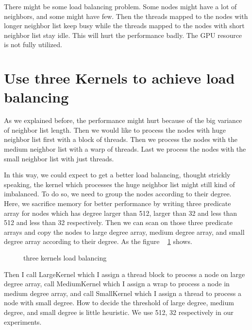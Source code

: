 \documentclass[12pt] {article}
\begin{document}
There might be some load balancing problem. Some nodes might have a lot of neighbors, and some might have few. Then the threads mapped to the nodes with longer neighbor
list keep busy while the threads mapped to the nodes with short neighbor list stay idle. This will hurt the performance badly. The GPU resource is not fully
utilized.

\section*{Use three Kernels to achieve load balancing}
As we explained before, the performance might hurt because of the big variance of neighbor list length. Then we would like to process the nodes with huge neighbor list first
with a block of threads. Then we process the nodes with the medium neighbor list with a warp of threads. Last we process the nodes with the small neighbor list with just threads.

In this way, we could expect to get a better load balancing, thought strickly speaking, the kernel which processes the huge neighbor list might still kind of imbalanced. To
do so, we need to group the nodes according to their degree. Here, we sacrifice memory for better performance by writing three predicate array for nodes which has
degree larger than 512, larger than 32 and less than 512 and less than 32 respectively. Then we can scan on those three predicate arrays and copy the nodes to large
degree array, medium degree array, and small degree array according to their degree. As the figure ~ \ref{fig:fig1} shows.

\begin{figure}[!tbh]
\centering        
   \caption{ three kernels load balancing }
   \label{fig:fig1}
\end{figure}

Then I call LargeKernel which I assign a thread block to process a node on large degree array, call MediumKernel which I assign a wrap to process a node in medium degree
array, and call SmallKernel which I assign a thread to process a node with small degree. How to decide the threshold of large degree, medium degree, and small degree is
little heuristic. We use 512, 32 respectively in our experiments. 
\end{document}
